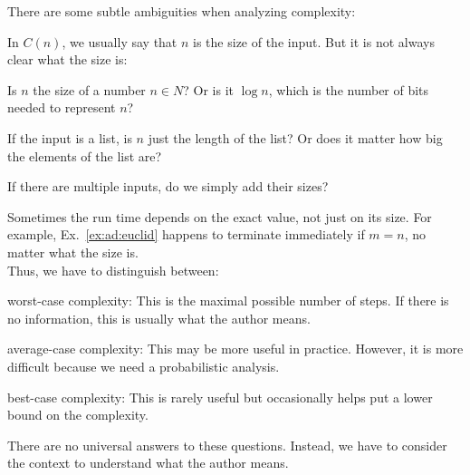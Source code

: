 There are some subtle ambiguities when analyzing complexity:
\begin{compactitem}
 \item In $C(n)$, we usually say that $n$ is the size of the input.
 But it is not always clear what the size is:
  \begin{compactitem}
  \item Is $n$ the size of a number $n\in N$? Or is it $\log n$, which is the number of bits needed to represent $n$?
  \item If the input is a list, is $n$ just the length of the list? Or does it matter how big the elements of the list are?
  \item If there are multiple inputs, do we simply add their sizes?
  \end{compactitem}
\item Sometimes the run time depends on the exact value, not just on its size.
 For example, Ex.~\ref{ex:ad:euclid} happens to terminate immediately if $m=n$, no matter what the size is.\\
 Thus, we have to distinguish between:
  \begin{compactitem}
  \item worst-case complexity: This is the maximal possible number of steps. If there is no information, this is usually what the author means.
  \item average-case complexity: This may be more useful in practice. However, it is more difficult because we need a probabilistic analysis.
  \item best-case complexity: This is rarely useful but occasionally helps put a lower bound on the complexity.
  \end{compactitem}
\end{compactitem}
There are no universal answers to these questions.
Instead, we have to consider the context to understand what the author means.

